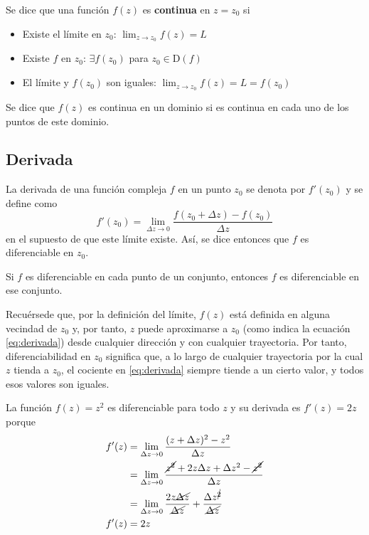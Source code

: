 Se dice que una función $f(z)$ es \textbf{continua} en $z=z_0$ si
\begin{itemize}
  \item Existe el límite en $z_0$: $\lim_{z\to z_0} f(z) = L$
  \item Existe $f$ en $z_0$: $\exists f(z_0) $ para $z_0 \in\text{D}(f)$
  \item El límite y $f(z_0)$ son iguales: $\lim_{z\to z_0} f(z) = L = f(z_0)$
\end{itemize}

Se dice que $f(z)$ es continua en un dominio si es continua en cada uno de los puntos de este dominio.

\subsection{Derivada}

La derivada de una función compleja $f$ en un punto $z_0$ se denota por $f'(z_0)$ y se define como
\begin{equation}
  \boxed{f'(z_0)=\lim_{\Delta z \to 0}\frac{f(z_0+\Delta z)-f(z_0)}{\Delta z}}
  \label{eq:derivada}
\end{equation}
en el supuesto de que este límite existe. Así, se dice entonces que $f$ es diferenciable en $z_0$. 

Si $f$ es diferenciable en cada punto de un conjunto, entonces $f$ es diferenciable en ese conjunto.

Recuérsede que, por la definición del límite, $f(z)$ está definida en alguna vecindad de $z_0$ y, por tanto, $z$ puede aproximarse a $z_0$ (como indica la ecuación \ref{eq:derivada}) desde cualquier dirección y con cualquier trayectoria. Por tanto, diferenciabilidad en $z_0$ significa que, a lo largo de cualquier trayectoria por la cual $z$ tienda a $z_0$, el cociente en \ref{eq:derivada} siempre tiende a un cierto valor, y todos esos valores son iguales. 
\begin{example}
  La función $f(z)=z^2$ es diferenciable para todo $z$ y su derivada es $f'(z)=2z$ porque
  \begin{align*}
    f'(z)&=\lim_{\Delta z \to 0} \frac{(z+\Delta z)^2-z^2}{\Delta z} \\
         &=\lim_{\Delta z \to 0} \frac{\cancel{z^2}+2z\Delta z + \Delta z^2 - \cancel{z^2}}{\Delta z} \\ 
         &=\lim_{\Delta z \to 0} \frac{2z\cancel{\Delta z}}{\cancel{\Delta z}} + \frac{\Delta z^{\cancel{2}}}{\cancel{\Delta z}} \\ 
    f'(z)&=2z
  \end{align*}
\end{example}

